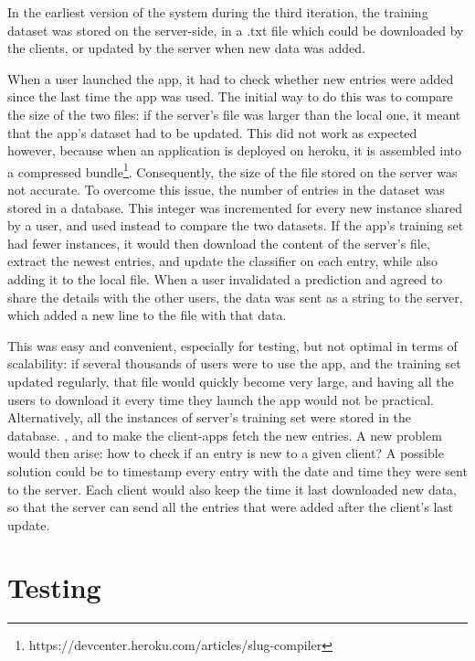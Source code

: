 \documentclass{mproj}
\begin{document}
In the earliest version of the system during the third iteration, the training dataset was stored on the server-side, in a .txt file which could be downloaded by the clients, or updated by the server when new data was added. \par

When a user launched the app, it had to check whether new entries were added since the last time the app was used. The initial way to do this was to compare the size of the two files: if the server's file was larger than the local one, it meant that the app's dataset had to be updated. This did not work as expected however, because when an application is deployed on heroku, it is assembled into a compressed bundle\footnote{https://devcenter.heroku.com/articles/slug-compiler}. Consequently, the size of the file stored on the server was not accurate. To overcome this issue, the number of entries in the dataset was stored in a database. This integer was incremented for every new instance shared by a user, and used instead to compare the two datasets. If the app's training set had fewer instances, it would then download the content of the server's file, extract the newest entries, and update the classifier on each entry, while also adding it to the local file. When a user invalidated a prediction and agreed to share the details with the other users, the data was sent as a string to the server, which added a new line to the file with that data.\par

This was easy and convenient, especially for testing, but not optimal in terms of scalability: if several thousands of users were to use the app, and the training set updated regularly, that file would quickly become very large, and having all the users to download it every time they launch the app would not be practical. Alternatively, all the instances of server's training set were stored in the database. , and to make the client-apps fetch the new entries. A new problem would then arise: how to check if an entry is new to a given client? A possible solution could be to timestamp every entry with the date and time they were sent to the server. Each client would also keep the time it last downloaded new data, so that the server can send all the entries that were added after the client's last update. \par

\section{Testing}
\end{document}
